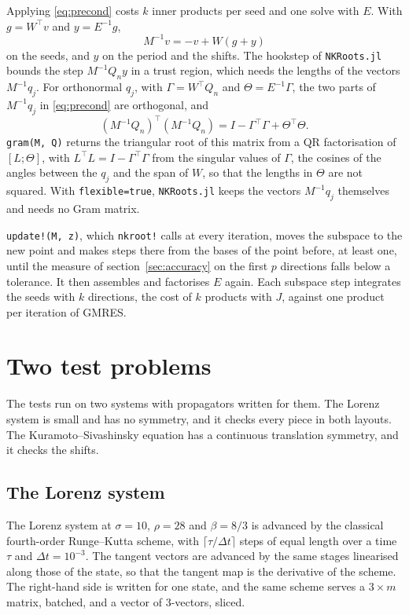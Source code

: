 \documentclass[11pt,a4paper]{article}
\newcommand{\code}[1]{\texttt{#1}}
\begin{document}
Applying \eqref{eq:precond} costs $k$ inner products per seed and one solve with $E$. With
$g = W^{\!\top} v$ and $y = E^{-1} g$,
\begin{equation}
  M^{-1} v = -v + W (g + y)
\end{equation}
on the seeds, and $y$ on the period and the shifts. The hookstep of \code{NKRoots.jl} bounds the
step $M^{-1} Q_n y$ in a trust region, which needs the lengths of the vectors $M^{-1} q_j$. For
orthonormal $q_j$, with $\Gamma = W^{\!\top} Q_n$ and $\Theta = E^{-1} \Gamma$, the two parts of
$M^{-1} q_j$ in \eqref{eq:precond} are orthogonal, and
\begin{equation}
  (M^{-1} Q_n)^{\!\top} (M^{-1} Q_n) = I - \Gamma^{\!\top} \Gamma + \Theta^{\!\top} \Theta .
\end{equation}
\code{gram(M, Q)} returns the triangular root of this matrix from a QR factorisation of
$[L; \Theta]$, with $L^{\!\top} L = I - \Gamma^{\!\top} \Gamma$ from the singular values of $\Gamma$,
the cosines of the angles between the $q_j$ and the span of $W$, so that the lengths in $\Theta$
are not squared. With \code{flexible=true}, \code{NKRoots.jl} keeps the vectors $M^{-1} q_j$
themselves and needs no Gram matrix.

\code{update!(M, z)}, which \code{nkroot!} calls at every iteration, moves the subspace to the new
point and makes steps there from the bases of the point before, at least one, until the measure
of section~\ref{sec:accuracy} on the first $p$ directions falls below a tolerance. It then
assembles and factorises $E$ again. Each subspace step integrates the seeds with $k$ directions,
the cost of $k$ products with $J$, against one product per iteration of GMRES.

\section{Two test problems}
\label{sec:tests}

The tests run on two systems with propagators written for them. The Lorenz system is small and
has no symmetry, and it checks every piece in both layouts. The Kuramoto--Sivashinsky equation has
a continuous translation symmetry, and it checks the shifts.

\subsection{The Lorenz system}

The Lorenz system at $\sigma = 10$, $\rho = 28$ and $\beta = 8/3$ is advanced by the classical
fourth-order Runge--Kutta scheme, with $\lceil \tau/\Delta t \rceil$ steps of equal length over a
time $\tau$ and $\Delta t = 10^{-3}$. The tangent vectors are advanced by the same stages
linearised along those of the state, so that the tangent map is the derivative of the scheme. The
right-hand side is written for one state, and the same scheme serves a $3 \times m$ matrix,
batched, and a vector of 3-vectors, sliced.
\end{document}
